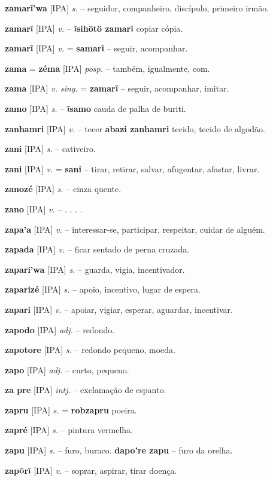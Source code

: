 \textbf{zamarĩ'wa} [IPA] \textit{s.} -- seguidor, companheiro, discípulo, primeiro irmão.

\textbf{zamarĩ} [IPA] \textit{v.} -- \textbf{ĩsihötö zamarĩ} copiar  cópia.

\textbf{zamarĩ} [IPA] \textit{v.} = \textbf{samarĩ} -- seguir, acompanhar.

\textbf{zama} = \textbf{zéma} [IPA] \textit{posp.} -- também, igualmente, com.

\textbf{zama} [IPA] \textit{v. sing.} = \textbf{zamarĩ} -- seguir, acompanhar, imitar.

\textbf{zamo} [IPA] \textit{s.} -- \textbf{ĩsamo} cauda de palha de buriti.

\textbf{zanhamri} [IPA] \textit{v.} -- tecer  \textbf{abazi zanhamri} tecido, tecido de algodão.

\textbf{zani} [IPA] \textit{s.} -- cativeiro.

\textbf{zani} [IPA] \textit{v.} = \textbf{sani} -- tirar, retirar, salvar, afugentar, afastar, livrar.

\textbf{zanozé} [IPA] \textit{s.} -- cinza quente.

\textbf{zano} [IPA] \textit{v.} -- . . . .

\textbf{zapa'a} [IPA] \textit{v.} -- interessar-se, participar, respeitar, cuidar de alguém.

\textbf{zapada} [IPA] \textit{v.} -- ficar sentado de perna cruzada.

\textbf{zapari'wa} [IPA] \textit{s.} -- guarda, vigia, incentivador.

\textbf{zaparizé} [IPA] \textit{s.} -- apoio, incentivo, lugar de espera.

\textbf{zapari} [IPA] \textit{v.} -- apoiar, vigiar, esperar, aguardar, incentivar.

\textbf{zapodo} [IPA] \textit{adj.} -- redondo.

\textbf{zapotore} [IPA] \textit{s.} -- redondo pequeno, moeda.

\textbf{zapo} [IPA] \textit{adj.} -- curto, pequeno.

\textbf{za pre} [IPA] \textit{intj.} -- exclamação de espanto.

\textbf{zapru} [IPA] \textit{s.} = \textbf{robzapru} poeira.

\textbf{zapré} [IPA] \textit{s.} -- pintura vermelha.

\textbf{zapu} [IPA] \textit{s.} -- furo, buraco.  \textbf{dapo're zapu} -- furo da orelha.

\textbf{zapõrĩ} [IPA] \textit{v.} -- soprar, aspirar, tirar doença.

